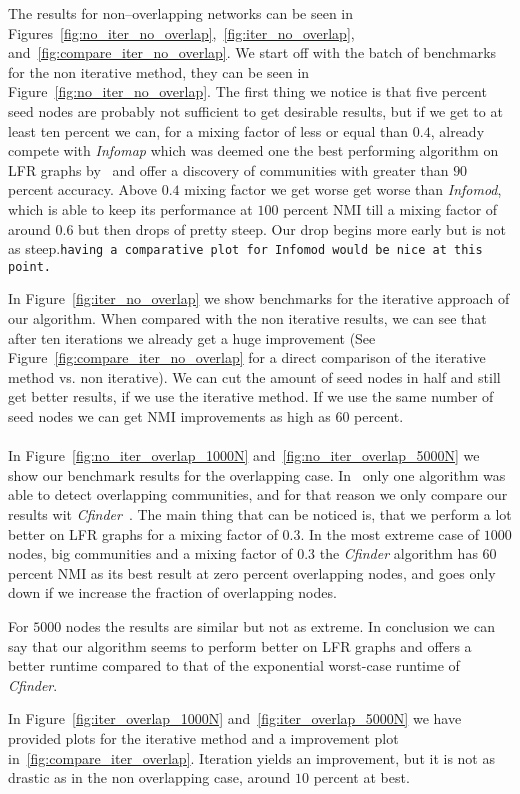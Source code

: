 The results for non--overlapping networks can be seen in Figures~\ref{fig:no_iter_no_overlap},~\ref{fig:iter_no_overlap}, and~\ref{fig:compare_iter_no_overlap}. We start off with the batch of benchmarks for the non iterative method, they can be seen in Figure~\ref{fig:no_iter_no_overlap}. The first thing we notice is that five percent seed nodes are probably not sufficient to get desirable results, but if we get to at least ten percent we can, for a mixing factor of less or equal than $0.4$, already compete with \textit{Infomap} which was deemed one the best performing algorithm on LFR graphs by~\cite{LF09} and offer a discovery of communities with greater than $90$ percent accuracy. Above $0.4$ mixing factor we get worse get worse than \textit{Infomod}, which is able to keep its performance at $100$ percent NMI till a mixing factor of around $0.6$ but then drops of pretty steep. Our drop begins more early but is not as steep.\texttt{having a comparative plot for Infomod would be nice at this point.}

In Figure~\ref{fig:iter_no_overlap} we show benchmarks for the iterative approach of our algorithm. When compared with the non iterative results, we can see that after ten iterations we already get a huge improvement (See Figure~\ref{fig:compare_iter_no_overlap} for a direct comparison of the iterative method vs. non iterative). We can cut the amount of seed nodes in half and still get better results, if we use the iterative method. If we use the same number of seed nodes we can get NMI improvements as high as $60$ percent.\\ \\
In Figure~\ref{fig:no_iter_overlap_1000N} and~\ref{fig:no_iter_overlap_5000N} we show our benchmark results for the overlapping case. In~\cite{LF09} only one algorithm was able to detect overlapping communities, and for that reason we only compare our results wit \textit{Cfinder}~\cite{PDFV05}. The main thing that can be noticed is, that we perform a lot better on LFR graphs for a mixing factor of $0.3$. In the most extreme case of $1000$ nodes, big communities and a mixing factor of $0.3$ the \textit{Cfinder} algorithm has $60$ percent NMI as its best result at zero percent overlapping nodes, and goes only down if we increase the fraction of overlapping nodes.

For $5000$ nodes the results are similar but not as extreme. In conclusion we can say that our algorithm seems to perform better on LFR graphs and offers a better runtime compared to that of the exponential worst-case runtime of \textit{Cfinder}.

In Figure~\ref{fig:iter_overlap_1000N} and~\ref{fig:iter_overlap_5000N} we have provided plots for the iterative method and a improvement plot in~\ref{fig:compare_iter_overlap}. Iteration yields an improvement, but it is not as drastic as in the non overlapping case, around $10$ percent at best.